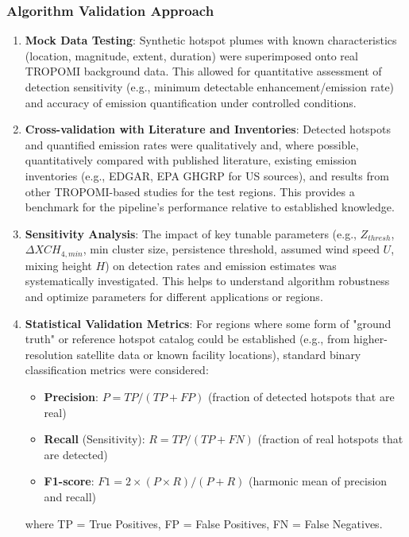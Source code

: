 \documentclass[12pt,a4paper]{article}
\begin{document}
\subsubsection{Algorithm Validation Approach}
\begin{enumerate}
    \item \textbf{Mock Data Testing}: Synthetic hotspot plumes with known characteristics (location, magnitude, extent, duration) were superimposed onto real TROPOMI background data. This allowed for quantitative assessment of detection sensitivity (e.g., minimum detectable enhancement/emission rate) and accuracy of emission quantification under controlled conditions.
    \item \textbf{Cross-validation with Literature and Inventories}: Detected hotspots and quantified emission rates were qualitatively and, where possible, quantitatively compared with published literature, existing emission inventories (e.g., EDGAR, EPA GHGRP for US sources), and results from other TROPOMI-based studies for the test regions. This provides a benchmark for the pipeline's performance relative to established knowledge.
    \item \textbf{Sensitivity Analysis}: The impact of key tunable parameters (e.g., $Z_{thresh}$, $\Delta XCH_{4,min}$, min cluster size, persistence threshold, assumed wind speed $U$, mixing height $H$) on detection rates and emission estimates was systematically investigated. This helps to understand algorithm robustness and optimize parameters for different applications or regions.
    \item \textbf{Statistical Validation Metrics}: For regions where some form of "ground truth" or reference hotspot catalog could be established (e.g., from higher-resolution satellite data or known facility locations), standard binary classification metrics were considered:
        \begin{itemize}
            \item \textbf{Precision}: $P = TP / (TP + FP)$ (fraction of detected hotspots that are real)
            \item \textbf{Recall} (Sensitivity): $R = TP / (TP + FN)$ (fraction of real hotspots that are detected)
            \item \textbf{F1-score}: $F1 = 2 \times (P \times R) / (P + R)$ (harmonic mean of precision and recall)
        \end{itemize}
        where TP = True Positives, FP = False Positives, FN = False Negatives.
\end{enumerate}
\end{document}
